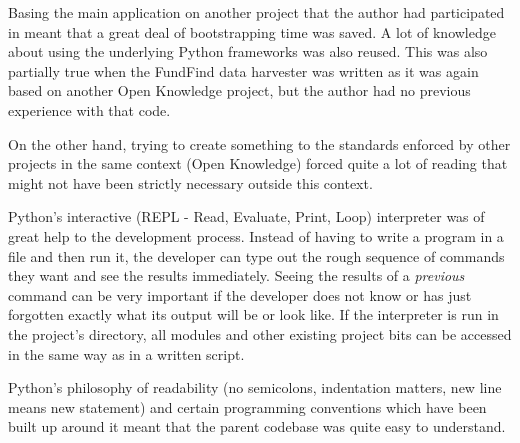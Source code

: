 

Basing the main application on another project that the author had participated in meant that a great deal of bootstrapping time was saved. A lot of knowledge about using the underlying Python frameworks was also reused. This was also partially true when the FundFind data harvester was written as it was again based on another Open Knowledge project, but the author had no previous experience with that code.

On the other hand, trying to create something to the standards enforced by other projects in the same context (Open Knowledge) forced quite a lot of reading that might not have been strictly necessary outside this context.

Python's interactive (REPL - Read, Evaluate, Print, Loop) interpreter was of great help to the development process. Instead of having to write a program in a file and then run it, the developer can type out the rough sequence of commands they want and see the results immediately. Seeing the results of a \emph{previous} command can be very important if the developer does not know or has just forgotten exactly what its output will be or look like. If the interpreter is run in the project's directory, all modules and other existing project bits can be accessed in the same way as in a written script.

Python's philosophy of readability (no semicolons, indentation matters, new line means new statement) and certain programming conventions which have been built up around it meant that the parent codebase was quite easy to understand.

